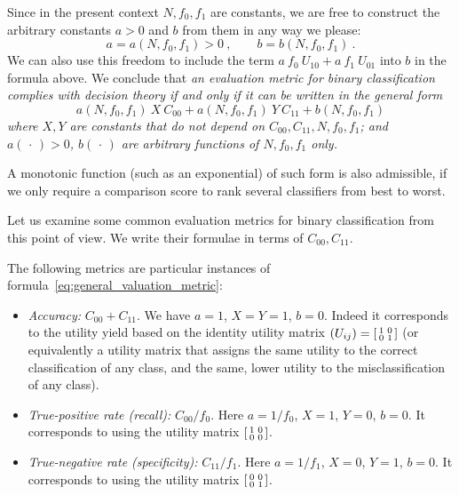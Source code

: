 \documentclass[\ifafour a4paper,12pt,\else a5paper,10pt,\fi%
onecolumn,oneside,article,%
british%
]{memoir}
\theoremstyle{remark}
\theoremstyle{innote}
\newcommand*{\dotv}{\mathord{\,\cdot\,}}%
\renewcommand*{\|}[1][]{\nonscript\:#1\vert\nonscript\:\mathopen{}}
\newcommand*{\itemyes}{{\fontencoding{U}\fontfamily{pzd}\selectfont\symbol{51}}}
\newcommand*{\cx}{X}
\newcommand*{\cy}{Y}
\begin{document}
Since in the present context $N, f_{0}, f_{1}$ are constants, we are free to construct the arbitrary constants $a > 0$ and $b$ from them in any way we please:
\begin{equation}
  \label{eq:constants_functions}
  a = a(N, f_{0}, f_{1}) > 0\ , \qquad
  b = b(N, f_{0}, f_{1}) \ .
\end{equation}
We can also use this freedom to include the term $a\ f_{0}\ U_{10} + a\ f_{1}\ U_{01}$ into $b$ in the formula above. We conclude that \emph{an evaluation metric for binary classification complies with decision theory if and only if it can be written in the general form}
\begin{equation}
  \label{eq:general_valuation_metric}
  a(N, f_{0}, f_{1})\ \cx\ C_{00} +
  a(N, f_{0}, f_{1})\ \cy\  C_{11} +
  b(N, f_{0}, f_{1})
\end{equation}
\emph{where $\cx,\cy$ are constants that do not depend on $C_{00}, C_{11}, N, f_{0}, f_{1}$; and $a(\dotv)>0$, $b(\dotv)$ are arbitrary functions of $N, f_{0}, f_{1}$ only.}

A monotonic function (such as an exponential) of such form is also admissible, if we only require a comparison score to rank several classifiers from best to worst.

Let us examine some common evaluation metrics for binary classification from this point of view. We write their formulae in terms of $C_{00}, C_{11}$.

The following metrics are particular instances of formula~\eqref{eq:general_valuation_metric}:
\begin{itemize}
\item[\itemyes] \emph{Accuracy:} $C_{00}+C_{11}$. We have $a=1$, $\cx=\cy=1$, $b=0$. Indeed it corresponds to the utility yield based on the identity utility matrix $(U_{ij}) = \begin{bsmallmatrix} 1&0\\0&1 \end{bsmallmatrix}$ (or equivalently a utility matrix that assigns the same utility to the correct classification of any class, and the same, lower utility to the misclassification of any class).
  
\item[\itemyes] \emph{True-positive rate (recall):} $C_{00}/f_{0}$. Here $a=1/f_{0}$, $\cx=1$, $\cy=0$, $b=0$. It corresponds to using the utility matrix $\begin{bsmallmatrix} 1&0\\0&0 \end{bsmallmatrix}$. 

\item[\itemyes] \emph{True-negative rate (specificity):} $C_{11}/f_{1}$. Here $a=1/f_{1}$, $\cx=0$, $\cy=1$, $b=0$. It corresponds to using the utility matrix $\begin{bsmallmatrix} 0&0\\0&1 \end{bsmallmatrix}$. 
\end{itemize}
\end{document}
